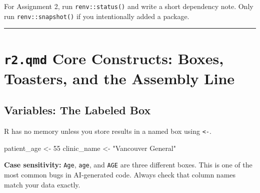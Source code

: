 \documentclass[
  letterpaper,
  DIV=11,
  numbers=noendperiod,
  oneside]{scrreprt}
\newenvironment{Shaded}{\begin{snugshade}}{\end{snugshade}}
\newcommand{\DecValTok}[1]{\textcolor[rgb]{0.68,0.00,0.00}{#1}}
\newcommand{\NormalTok}[1]{\textcolor[rgb]{0.00,0.23,0.31}{#1}}
\newcommand{\OtherTok}[1]{\textcolor[rgb]{0.00,0.23,0.31}{#1}}
\newcommand{\StringTok}[1]{\textcolor[rgb]{0.13,0.47,0.30}{#1}}
\begin{document}
For Assignment 2, run \texttt{renv::status()} and write a short
dependency note. Only run \texttt{renv::snapshot()} if you intentionally
added a package.

\begin{center}\rule{0.5\linewidth}{0.5pt}\end{center}

\section*{\texorpdfstring{\texttt{r2.qmd} Core Constructs: Boxes,
Toasters, and the Assembly
Line}{r2.qmd Core Constructs: Boxes, Toasters, and the Assembly Line}}\label{r2.qmd-core-constructs-boxes-toasters-and-the-assembly-line}


\subsection*{Variables: The Labeled
Box}\label{variables-the-labeled-box}

R has no memory unless you store results in a named box using
\texttt{\textless{}-}.

\begin{Shaded}
\begin{Highlighting}[numbers=left,,]
\NormalTok{patient\_age }\OtherTok{\textless{}{-}} \DecValTok{55}
\NormalTok{clinic\_name }\OtherTok{\textless{}{-}} \StringTok{"Vancouver General"}
\end{Highlighting}
\end{Shaded}

\begin{tcolorbox}[enhanced jigsaw, opacitybacktitle=0.6, colbacktitle=quarto-callout-warning-color!10!white, breakable, opacityback=0, coltitle=black, toptitle=1mm, bottomrule=.15mm, colframe=quarto-callout-warning-color-frame, bottomtitle=1mm, colback=white, leftrule=.75mm, rightrule=.15mm, title=\textcolor{quarto-callout-warning-color}{\faExclamationTriangle}\hspace{0.5em}{Warning}, left=2mm, arc=.35mm, toprule=.15mm, titlerule=0mm]

\textbf{Case sensitivity:} \texttt{Age}, \texttt{age}, and \texttt{AGE}
are three different boxes. This is one of the most common bugs in
AI-generated code. Always check that column names match your data
exactly.

\end{tcolorbox}
\end{document}
